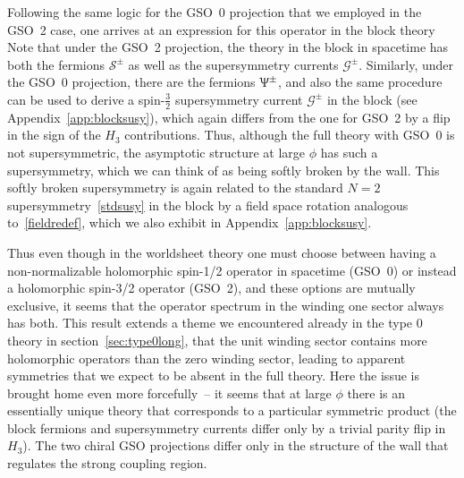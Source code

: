\documentclass[12pt]{article}
\def\PsiST{\Uppsi}
\numberwithin{equation}{section}
\def\cG{\mathcal {G}} \def\cH{\mathcal {H}} \def\cI{\mathcal {I}}
\def\cS{\mathcal {S}} \def\cT{\mathcal {T}} \def\cU{\mathcal {U}}
\def\exp{{\rm exp}}
\begin{document}
Following the same logic for the GSO~0 projection that we employed in the GSO~2 case, one arrives at an expression for this operator in the block theory 
\eqn[Spmhat]{
\PsiST^\pm = \exp\Big[ \pm \frac i2 \Big( H_3 + a\, Z + \sqrt{\frac2k}\, Y\Big) \Big] ~.
}
Note that under the GSO~2 projection, the theory in the block in spacetime has both the fermions $\cS^\pm$ as well as the supersymmetry currents $\cG^\pm$.  Similarly, under the GSO~0 projection, there are the fermions $\PsiST^\pm$, and also the same procedure can be used to derive a spin-$\frac32$ supersymmetry current $\cG^\pm$ in the block (see Appendix~\ref{app:blocksusy}), which again differs from the one for GSO~2 by a flip in the sign of the $H_3$ contributions.  Thus, although the full theory with GSO~0 is not supersymmetric, the asymptotic structure at large $\phi$ has such a supersymmetry, which we can think of as being softly broken by the wall.  This softly broken supersymmetry is again related to the standard $N=2$ supersymmetry~\eqref{stdsusy} in the block by a field space rotation analogous to~\eqref{fieldredef}, which we also exhibit in Appendix~\ref{app:blocksusy}.



Thus even though in the worldsheet theory one must choose between having a non-normalizable holomorphic spin-1/2 operator in spacetime (GSO~0) or instead a holomorphic spin-3/2 operator (GSO~2), and these options are mutually exclusive, it seems that the operator spectrum in the winding one sector always has both.  This result extends a theme we encountered already in the type 0 theory in section~\ref{sec:type0long}, that the unit winding sector contains more holomorphic operators than the zero winding sector, leading to apparent symmetries that we expect to be absent in the full theory.  Here the issue is brought home even more forcefully~-- it seems that at large $\phi$ there is an essentially unique theory that corresponds to a particular symmetric product (the block fermions and supersymmetry currents differ only by a trivial parity flip in $H_3$).  The two chiral GSO projections differ only in the structure of the wall that regulates the strong coupling region.  
\end{document}
